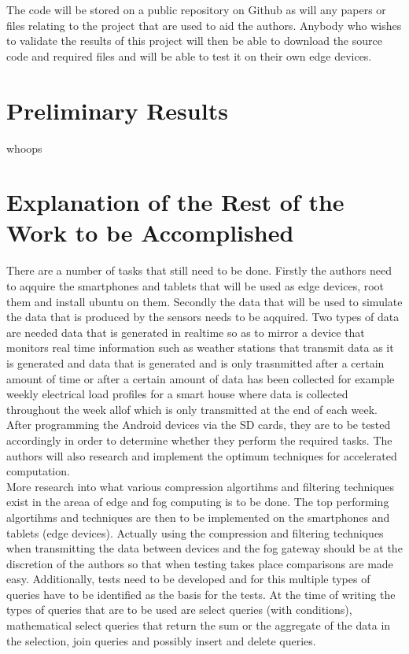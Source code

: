 \documentclass[11pt,journal, a4paper]{IEEEtran}
\begin{document}
\noindent
The code will be stored on a public repository on Github as will any papers or files relating to the project that are used to aid the authors. Anybody who wishes to validate the results of this project will then be able to download the source code and required files and will be able to test it on their own edge devices. 
\section{Preliminary Results}
\noindent
whoops

\section{Explanation of the Rest of the Work to be Accomplished}
\noindent
There are a number of tasks that still need to be done. Firstly the authors need to aqquire the smartphones and tablets that will be used as edge devices, root them and install ubuntu on them. Secondly the data that will be used to simulate the data that is produced by the sensors needs to be aqquired. Two types of data are needed data that is generated in realtime so as to mirror a device that monitors real time information such as weather stations that transmit data as it is generated and data that is generated and is only trasnmitted after a certain amount of time or after a certain amount of data has been collected for example weekly electrical load profiles for a smart house where data is collected throughout the week allof which is only transmitted at the end of each week.\\

\noindent
After programming the Android devices via the SD cards, they are to be tested accordingly in order to determine whether they perform the required tasks. The authors will also research and implement the optimum techniques for accelerated computation.\\

\noindent
More research into what various compression algortihms and filtering techniques exist in the areaa of edge and fog computing is to be done. The top performing algortihms and techniques are then to be implemented on the smartphones and tablets (edge devices). Actually using the compression and filtering techniques when transmitting the data between devices and the fog gateway should be at the discretion of the authors so that when testing takes place comparisons are made easy. Additionally, tests need to be developed and for this multiple types of queries have to be identified as the basis for the tests. At the time of writing the types of queries that are to be used are select queries (with conditions), mathematical select queries that return the sum or the aggregate of the data in the selection, join queries and possibly insert and delete queries. 
\end{document}
